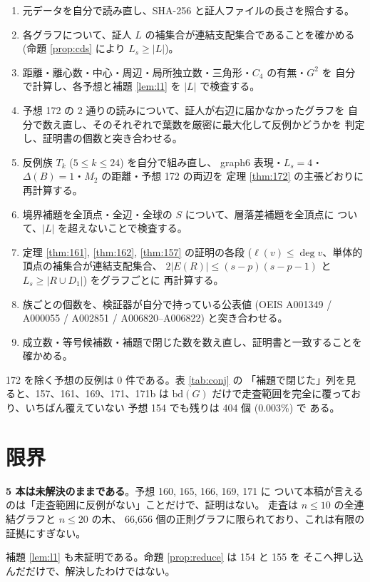 \documentclass[paper=a4,fontsize=10.5pt,jafontsize=10.5pt]{jlreq}
\theoremstyle{plain}
\theoremstyle{definition}
\begin{document}
\begin{enumerate}
\item 元データを自分で読み直し、SHA-256 と証人ファイルの長さを照合する。
\item 各グラフについて、証人 $L$ の補集合が連結支配集合であることを確かめる
  (命題 \ref{prop:cds} により $L_s \ge |L|$)。
\item 距離・離心数・中心・周辺・局所独立数・三角形・$C_4$ の有無・$G^2$ を
  自分で計算し、各予想と補題 \ref{lem:l1} を $|L|$ で検査する。
\item 予想 172 の 2 通りの読みについて、証人が右辺に届かなかったグラフを
  自分で数え直し、そのそれぞれで葉数を厳密に最大化して反例かどうかを
  判定し、証明書の個数と突き合わせる。
\item 反例族 $T_k$ ($ 5 \le k \le 24$) を自分で組み直し、
  graph6 表現・$L_s = 4$・$\Delta(B) = 1$・$M_2$ の距離・予想 172 の両辺を
  定理 \ref{thm:172} の主張どおりに再計算する。
\item 境界補題を全頂点・全辺・全球の $S$ について、層落差補題を全頂点に
  ついて、$|L|$ を超えないことで検査する。
\item 定理 \ref{thm:161}, \ref{thm:162}, \ref{thm:157} の証明の各段
  ($\ell(v) \le \deg v$、単体的頂点の補集合が連結支配集合、
  $2|E(R)| \le (s-p)(s-p-1)$ と $L_s \ge |R \cup D_1|$) をグラフごとに
  再計算する。
\item 族ごとの個数を、検証器が自分で持っている公表値 (OEIS A001349 /
  A000055 / A002851 / A006820--A006822) と突き合わせる。
\item 成立数・等号候補数・補題で閉じた数を数え直し、証明書と一致することを
  確かめる。
\end{enumerate}

172 を除く予想の反例は 0 件である。表 \ref{tab:conj} の
「補題で閉じた」列を見ると、157、161、169、171、171b
は $\mathrm{bd}(G)$ だけで走査範囲を完全に覆っており、いちばん覆えていない
予想 154 でも残りは 404 個 (0.003\%) で
ある。

\section{限界}

\textbf{5 本は未解決のままである}。予想 160, 165, 166, 169, 171 に
ついて本稿が言えるのは「走査範囲に反例がない」ことだけで、証明はない。
走査は $n \le 10$ の全連結グラフと $n \le 20$ の木、
66,656 個の正則グラフに限られており、これは有限の証拠にすぎない。

補題 \ref{lem:l1} も未証明である。命題 \ref{prop:reduce} は 154 と 155 を
そこへ押し込んだだけで、解決したわけではない。
\end{document}
